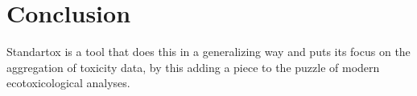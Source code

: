 \section*{Conclusion}

Standartox is a tool that does this in a generalizing way and puts its focus on the aggregation of toxicity data, by this adding a piece to the puzzle of modern ecotoxicological analyses.